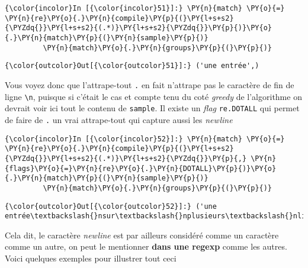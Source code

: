     \begin{Verbatim}[commandchars=\\\{\},frame=single,framerule=0.3mm,rulecolor=\color{cellframecolor}]
{\color{incolor}In [{\color{incolor}51}]:} \PY{n}{match} \PY{o}{=} \PY{n}{re}\PY{o}{.}\PY{n}{compile}\PY{p}{(}\PY{l+s+s2}{\PYZdq{}}\PY{l+s+s2}{(.*)}\PY{l+s+s2}{\PYZdq{}}\PY{p}{)}\PY{o}{.}\PY{n}{match}\PY{p}{(}\PY{n}{sample}\PY{p}{)}
         \PY{n}{match}\PY{o}{.}\PY{n}{groups}\PY{p}{(}\PY{p}{)}
\end{Verbatim}


\begin{Verbatim}[commandchars=\\\{\},frame=single,framerule=0.3mm,rulecolor=\color{cellframecolor}]
{\color{outcolor}Out[{\color{outcolor}51}]:} ('une entrée',)
\end{Verbatim}
            
    Vous voyez donc que l'attrape-tout
\texttt{\textquotesingle{}.\textquotesingle{}} en fait n'attrape pas le
caractère de fin de ligne \texttt{\textbackslash{}n}, puisque si c'était
le cas et compte tenu du coté \emph{greedy} de l'algorithme on devrait
voir ici tout le contenu de \texttt{sample}. Il existe un \emph{flag}
\texttt{re.DOTALL} qui permet de faire de \texttt{.} un vrai
attrape-tout qui capture aussi les \emph{newline}

    \begin{Verbatim}[commandchars=\\\{\},frame=single,framerule=0.3mm,rulecolor=\color{cellframecolor}]
{\color{incolor}In [{\color{incolor}52}]:} \PY{n}{match} \PY{o}{=} \PY{n}{re}\PY{o}{.}\PY{n}{compile}\PY{p}{(}\PY{l+s+s2}{\PYZdq{}}\PY{l+s+s2}{(.*)}\PY{l+s+s2}{\PYZdq{}}\PY{p}{,} \PY{n}{flags}\PY{o}{=}\PY{n}{re}\PY{o}{.}\PY{n}{DOTALL}\PY{p}{)}\PY{o}{.}\PY{n}{match}\PY{p}{(}\PY{n}{sample}\PY{p}{)}
         \PY{n}{match}\PY{o}{.}\PY{n}{groups}\PY{p}{(}\PY{p}{)}
\end{Verbatim}


\begin{Verbatim}[commandchars=\\\{\},frame=single,framerule=0.3mm,rulecolor=\color{cellframecolor}]
{\color{outcolor}Out[{\color{outcolor}52}]:} ('une entrée\textbackslash{}nsur\textbackslash{}nplusieurs\textbackslash{}nlignes\textbackslash{}n',)
\end{Verbatim}
            
    Cela dit, le caractère \emph{newline} est par ailleurs considéré comme
un caractère comme un autre, on peut le mentionner \textbf{dans une
regexp} comme les autres. Voici quelques exemples pour illustrer tout
ceci

